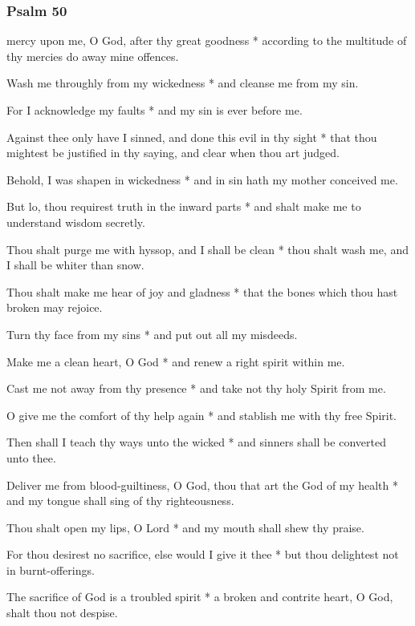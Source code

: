 \subsubsection{Psalm 50}


 mercy upon me, O God, after thy great goodness * according to the multitude of thy mercies do away mine offences.

Wash me throughly from my wickedness * and cleanse me from my sin.

For I acknowledge my faults * and my sin is ever before me.

Against thee only have I sinned, and done this evil in thy sight * that thou mightest be justified in thy saying, and clear when thou art judged.

Behold, I was shapen in wickedness * and in sin hath my mother conceived me.

But lo, thou requirest truth in the inward parts * and shalt make me to understand wisdom secretly.

Thou shalt purge me with hyssop, and I shall be clean * thou shalt wash me, and I shall be whiter than snow.

Thou shalt make me hear of joy and gladness * that the bones which thou hast broken may rejoice.

Turn thy face from my sins * and put out all my misdeeds.

Make me a clean heart, O God * and renew a right spirit within me.

Cast me not away from thy presence * and take not thy holy Spirit from me.

O give me the comfort of thy help again * and stablish me with thy free Spirit.

Then shall I teach thy ways unto the wicked * and sinners shall be converted unto thee.

Deliver me from blood-guiltiness, O God, thou that art the God of my health * and my tongue shall sing of thy righteousness.

Thou shalt open my lips, O Lord * and my mouth shall shew thy praise.

For thou desirest no sacrifice, else would I give it thee * but thou delightest not in burnt-offerings.

The sacrifice of God is a troubled spirit * a broken and contrite heart, O God, shalt thou not despise.

